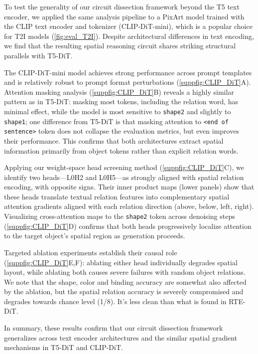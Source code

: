 \documentclass[10pt,twocolumn,letterpaper]{article}
\begin{document}
  To test the generality of our circuit dissection framework beyond the T5 text encoder, we applied the same analysis pipeline to a PixArt model trained with the CLIP text encoder and tokenizer (CLIP-DiT-mini), which is a popular choice for T2I models (\cref{fig:eval_T2I}). Despite architectural differences in text encoding, we find that the resulting spatial reasoning circuit shares striking structural parallels with T5-DiT. 
  
  The CLIP-DiT-mini model achieves strong performance across prompt templates and is relatively robust to prompt format perturbations (\cref{suppfig:CLIP_DiT}A). Attention masking analysis (\cref{suppfig:CLIP_DiT}B) reveals a highly similar pattern as in T5-DiT: masking most tokens, including the relation word, has minimal effect, while the model is most sensitive to \texttt{shape2} and slightly to \texttt{shape1}; 
  one difference from T5-DiT is that masking attention to \texttt{<end of sentence>} token does not collapse the evaluation metrics, but even improves their performance. 
  This confirms that both architectures extract spatial information primarily from object tokens rather than explicit relation words.
  
  Applying our weight-space head screening method (\cref{suppfig:CLIP_DiT}C), we identify two heads---L0H2 and L0H5---as strongly aligned with spatial relation encoding, with opposite signs. Their inner product maps (lower panels) show that these heads translate textual relation features into complementary spatial attention gradients aligned with each relation direction (above, below, left, right). Visualizing cross-attention maps to the \texttt{shape2} token across denoising steps (\cref{suppfig:CLIP_DiT}D) confirms that both heads progressively localize attention to the target object's spatial region as generation proceeds.
  
  Targeted ablation experiments establish their causal role (\cref{suppfig:CLIP_DiT}E,F): ablating either head individually degrades spatial layout, while ablating both causes severe failures with random object relations. We note that the shape, color and binding accuracy are somewhat also affected by the ablation, but the spatial relation accuracy is severely compromised and degrades towards chance level (1/8). It's less clean than what is found in RTE-DiT.
  
  In summary, these results confirm that our circuit dissection framework generalizes across text encoder architectures and the similar spatial gradient mechanisms in T5-DiT and CLIP-DiT.
  
\end{document}
